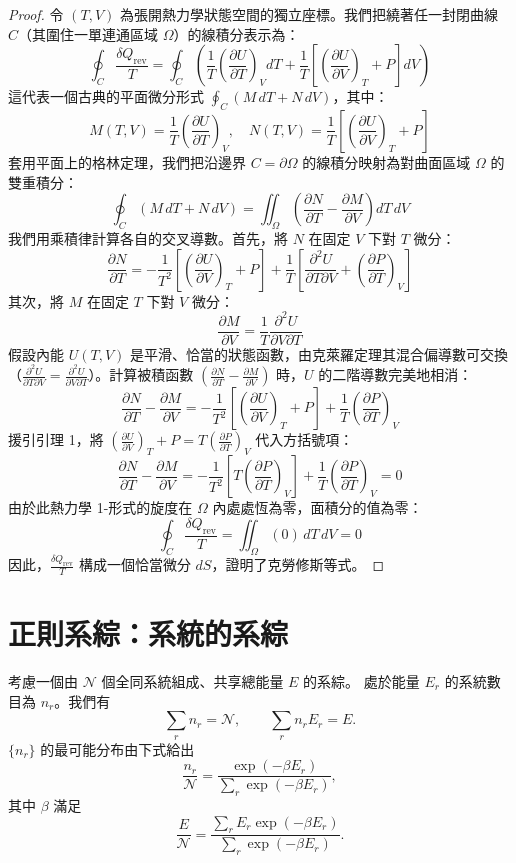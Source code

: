 \begin{proof}
令 $(T,V)$ 為張開熱力學狀態空間的獨立座標。我們把繞著任一封閉曲線 $C$（其圍住一單連通區域 $\Omega$）的線積分表示為：
\[
\oint_C \frac{\delta Q_{\text{rev}}}{T} = \oint_C \left( \frac{1}{T}\left(\frac{\partial U}{\partial T}\right)_V dT + \frac{1}{T}\left[\left(\frac{\partial U}{\partial V}\right)_T + P\right] dV \right)
\]
這代表一個古典的平面微分形式 $\oint_C (M\,dT + N\,dV)$，其中：
\[
M(T,V) = \frac{1}{T}\left(\frac{\partial U}{\partial T}\right)_V, \quad N(T,V) = \frac{1}{T}\left[\left(\frac{\partial U}{\partial V}\right)_T + P\right]
\]
套用平面上的格林定理，我們把沿邊界 $C = \partial \Omega$ 的線積分映射為對曲面區域 $\Omega$ 的雙重積分：
\[
\oint_C (M\,dT + N\,dV) = \iint_\Omega \left( \frac{\partial N}{\partial T} - \frac{\partial M}{\partial V} \right) dT\,dV
\]
我們用乘積律計算各自的交叉導數。首先，將 $N$ 在固定 $V$ 下對 $T$ 微分：
\[
\frac{\partial N}{\partial T} = -\frac{1}{T^2}\left[\left(\frac{\partial U}{\partial V}\right)_T + P\right] + \frac{1}{T}\left[ \frac{\partial^2 U}{\partial T \partial V} + \left(\frac{\partial P}{\partial T}\right)_V \right]
\]
其次，將 $M$ 在固定 $T$ 下對 $V$ 微分：
\[
\frac{\partial M}{\partial V} = \frac{1}{T}\frac{\partial^2 U}{\partial V \partial T}
\]
假設內能 $U(T,V)$ 是平滑、恰當的狀態函數，由克萊羅定理其混合偏導數可交換（$\frac{\partial^2 U}{\partial T \partial V} = \frac{\partial^2 U}{\partial V \partial T}$）。計算被積函數 $(\frac{\partial N}{\partial T} - \frac{\partial M}{\partial V})$ 時，$U$ 的二階導數完美地相消：
\[
\frac{\partial N}{\partial T} - \frac{\partial M}{\partial V} = -\frac{1}{T^2}\left[\left(\frac{\partial U}{\partial V}\right)_T + P\right] + \frac{1}{T}\left(\frac{\partial P}{\partial T}\right)_V
\]
援引引理 1，將 $\left(\frac{\partial U}{\partial V}\right)_T + P = T\left(\frac{\partial P}{\partial T}\right)_V$ 代入方括號項：
\[
\frac{\partial N}{\partial T} - \frac{\partial M}{\partial V} = -\frac{1}{T^2}\left[T\left(\frac{\partial P}{\partial T}\right)_V\right] + \frac{1}{T}\left(\frac{\partial P}{\partial T}\right)_V = 0
\]
由於此熱力學 1-形式的旋度在 $\Omega$ 內處處恆為零，面積分的值為零：
\[
\oint_C \frac{\delta Q_{\text{rev}}}{T} = \iint_\Omega (0)\,dT\,dV = 0
\]
因此，$\frac{\delta Q_{\text{rev}}}{T}$ 構成一個恰當微分 $dS$，證明了克勞修斯等式。
\end{proof}

\section{正則系綜：系統的系綜} \label{appendix:ensemble}
\begin{theorem}
考慮一個由 $\mathcal{N}$ 個全同系統組成、共享總能量 $E$ 的系綜。
處於能量 $E_r$ 的系統數目為 $n_r$。我們有
\[
    \sum_r n_r = \mathcal{N},\qquad \sum_r n_r E_r = E.
\]
$\{n_r\}$ 的最可能分布由下式給出
\[
    \frac{n_r}{\mathcal{N}} = \frac{\exp(-\beta E_r)}{\sum_r \exp(-\beta E_r)},
\]
其中 $\beta$ 滿足
\[
    \frac{E}{\mathcal{N}} = \frac{\sum_r E_r \exp(-\beta E_r)}{\sum_r \exp(-\beta E_r)}.
\]
\end{theorem}

